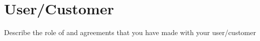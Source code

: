 \section{User/Customer}
Describe the role of and agreements that you have made with your user/customer
